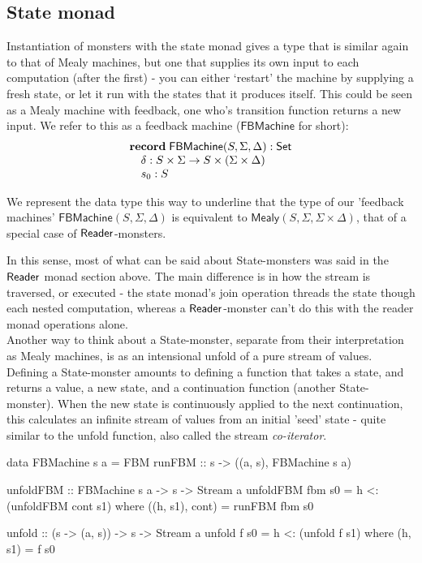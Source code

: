 \subsection{State monad}

Instantiation of monsters with the state monad gives a type that is similar again to that of Mealy machines, but one that supplies its own input to each computation (after the first) - you can either `restart' the machine by supplying a fresh state, or let it run with the states that it produces itself. This could be seen as a Mealy machine with feedback, one who's transition function returns a new input. We refer to this as a feedback machine ($\mathsf{FBMachine}$ for short):
$$
\begin{array}[t]{l}
\mathbf{record}\;
\mathsf{FBMachine}(S,\Sigma,\Delta):\mathsf{Set}\\
\quad \delta : S \times \Sigma \to S \times (\Sigma \times \Delta) \\
\quad s_0 : S
\end{array}
$$

We represent the data type this way to underline that the type of our 'feedback machines' $\mathsf{FBMachine}(S,\Sigma,\Delta)$ is equivalent to $\mathsf{Mealy}(S,\Sigma,\Sigma \times \Delta)$, that of a special case of $\mathsf{Reader}$-monsters.

In this sense, most of what can be said about State-monsters was said in the $\mathsf{Reader}$ monad section above. The main difference is in how the stream is traversed, or executed - the state monad's join operation threads the state though each nested computation, whereas a $\mathsf{Reader}$-monster can't do this with the reader monad operations alone. \\

Another way to think about a State-monster, separate from their interpretation as Mealy machines, is as an intensional unfold of a pure stream of values. Defining a State-monster amounts to defining a function that takes a state, and returns a value, a new state, and a continuation function (another State-monster). When the new state is continuously applied to the next continuation, this calculates an infinite stream of values from an initial 'seed' state - quite similar to the unfold function, also called the stream \emph{co-iterator}.

\begin{haskell}
data FBMachine s a = FBM { runFBM :: s -> ((a, s), FBMachine s a) }

unfoldFBM :: FBMachine s a -> s -> Stream a
unfoldFBM fbm s0 = h <: (unfoldFBM cont s1)
		where ((h, s1), cont) = runFBM fbm s0

unfold :: (s -> (a, s)) -> s -> Stream a
unfold f s0 = h <: (unfold f s1)
		where (h, s1) = f s0
\end{haskell}

